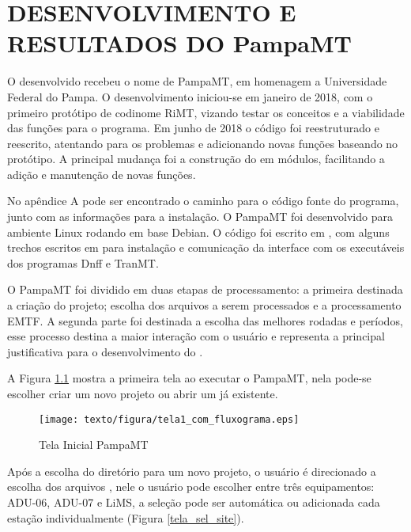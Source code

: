 \chapter{DESENVOLVIMENTO E RESULTADOS DO PampaMT}

    O  desenvolvido recebeu o nome de PampaMT, em homenagem a Universidade Federal do Pampa. O desenvolvimento iniciou-se em janeiro de 2018, com o primeiro protótipo de codinome RiMT, vizando testar os conceitos e a viabilidade das funções para o programa. Em junho de 2018 o código foi reestruturado e reescrito, atentando para os problemas e adicionando novas funções baseando no protótipo. A principal mudança foi a construção do  em módulos, facilitando a adição e manutenção de novas funções.
    
    No apêndice A pode ser encontrado o caminho para o código fonte do programa, junto com as informações para a instalação. O PampaMT foi desenvolvido para ambiente Linux rodando em base Debian. O código foi escrito em \Python, com alguns trechos escritos em \Shell{} para instalação e comunicação da interface com os executáveis dos programas Dnff e TranMT.
    
    O PampaMT foi dividido em duas etapas de processamento: a primeira destinada a criação do projeto; escolha dos arquivos a serem processados e a processamento EMTF. A segunda parte foi destinada a escolha das melhores rodadas e períodos, esse processo destina a maior interação com o usuário e representa a principal justificativa para o desenvolvimento do . 
    
    A Figura \ref{tela_inicial} mostra a primeira tela ao executar o PampaMT, nela pode-se escolher criar um novo projeto ou abrir um já existente.
    
    \begin{figure}[H]
        \caption{Tela Inicial PampaMT}
            \begin{center}
                \texttt{[image: texto/figura/tela1\_com\_fluxograma.eps]}
            \end{center}
        \label{tela_inicial}
    \end{figure}
    
     Após a escolha do diretório para um novo projeto, o usuário é direcionado a escolha dos arquivos , nele o usuário pode escolher entre três equipamentos: ADU-06, ADU-07 e LiMS, a seleção pode ser automática ou adicionada cada estação individualmente (Figura \ref{tela_sel_site}). 
    
